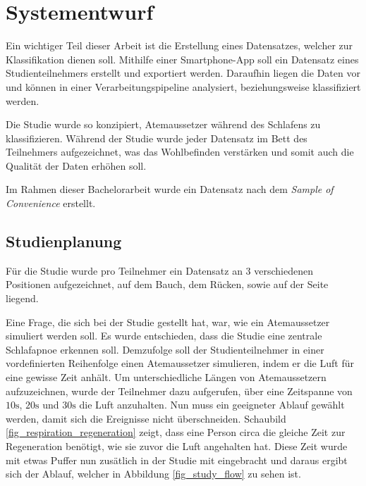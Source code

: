 \chapter{Systementwurf}
\label{ch:Design}

Ein wichtiger Teil dieser Arbeit ist die Erstellung eines Datensatzes, welcher zur Klassifikation dienen soll.
Mithilfe einer Smartphone-App soll ein Datensatz eines Studienteilnehmers erstellt und exportiert werden. 
Daraufhin liegen die Daten vor und können in einer Verarbeitungspipeline analysiert, beziehungsweise klassifiziert werden.

Die Studie wurde so konzipiert, Atemaussetzer während des Schlafens zu klassifizieren. 
Während der Studie wurde jeder Datensatz im Bett des Teilnehmers aufgezeichnet, was das Wohlbefinden verstärken und somit auch die Qualität der Daten erhöhen soll.

Im Rahmen dieser Bachelorarbeit wurde ein Datensatz  nach dem \textit{Sample of Convenience} erstellt.

\section{Studienplanung}
\label{ch:Design:sec:studienplanung}
Für die Studie wurde pro Teilnehmer ein Datensatz an 3 verschiedenen Positionen aufgezeichnet, auf dem Bauch, dem Rücken, sowie auf der Seite liegend.

Eine Frage, die sich bei der Studie gestellt hat, war, wie ein Atemaussetzer {\glqq simuliert\grqq} werden soll. 
Es wurde entschieden, dass die Studie eine zentrale Schlafapnoe erkennen soll. 
Demzufolge soll der Studienteilnehmer in einer vordefinierten Reihenfolge einen Atemaussetzer {\glqq simulieren\grqq}, indem er die Luft für eine gewisse Zeit anhält.
Um unterschiedliche Längen von Atemaussetzern aufzuzeichnen, wurde der Teilnehmer dazu aufgerufen, über eine Zeitspanne von $10\si{\s}$, $20\si{\s}$ und $30\si{\s}$ die Luft anzuhalten.
Nun muss ein geeigneter Ablauf gewählt werden, damit sich die Ereignisse nicht überschneiden.
Schaubild \ref{fig_respiration_regeneration} zeigt, dass eine Person circa die gleiche Zeit zur Regeneration benötigt, wie sie zuvor die Luft angehalten hat.
Diese Zeit wurde mit etwas Puffer nun zusätlich in der Studie mit eingebracht und daraus ergibt sich der Ablauf, welcher in Abbildung \ref{fig_study_flow} zu sehen ist.

